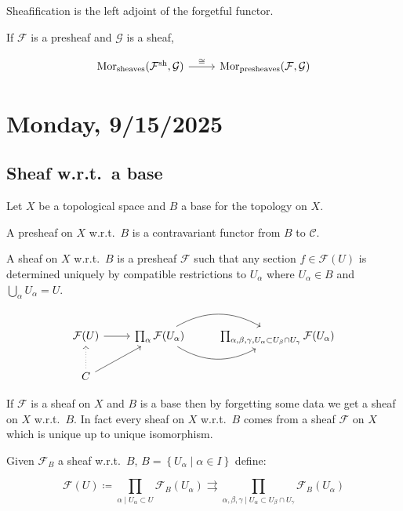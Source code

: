 \documentclass{article}
\theoremstyle{definition}
\begin{document}
    Sheafification is the left adjoint of the forgetful functor.

    If \(\mathcal{F}\) is a presheaf and \(\mathcal{G}\) is a sheaf,

    \[
        \begin{tikzcd}
            \operatorname{Mor}_{\text{sheaves}} (\mathcal{F}^{\operatorname{sh}}, \mathcal{G}) \ar[r, "\cong"] & \operatorname{Mor}_{\text{presheaves}} (\mathcal{F} , \mathcal{G}) 
        \end{tikzcd}
    \]

    \section*{Monday, 9/15/2025}

    \subsection*{Sheaf w.r.t.\ a base}
    
    Let \(X\) be a topological space and \(B\) a base for the topology on \(X\).

    A presheaf on \(X\) w.r.t.\ \(B\) is a contravariant functor from \(B\) to \(\mathcal{C}\).

    A sheaf on \(X\) w.r.t.\ \(B\) is a presheaf \(\mathcal{F}\) such that any section \(f\in \mathcal{F} (U)\) is determined uniquely by compatible restrictions to \(U_\alpha\) where \(U_\alpha \in B\) and \(\bigcup_{\alpha} U_\alpha = U\).

    \[
        \begin{tikzcd}
            \mathcal{F}(U) \ar[r] & \prod_{\alpha} \mathcal{F}(U_\alpha) \ar[r, bend right] \ar[r, bend left] & \prod_{\alpha,\beta,\gamma, U_\alpha \subset U_\beta \cap U_\gamma} \mathcal{F}(U_\alpha) \\ C \ar[u, dotted] \ar[ur]
        \end{tikzcd}
    \]

    If \(\mathcal{F}\) is a sheaf on \(X\) and \(B\) is a base then by forgetting some data we get a sheaf on \(X\) w.r.t.\ \(B\). In fact every sheaf on \(X\) w.r.t.\ \(B\) comes from a sheaf \(\mathcal{F}\) on \(X\) which is unique up to unique isomorphism.

    Given \(\mathcal{F}_B\) a sheaf w.r.t.\ \(B\), \(B = \left\{ U_\alpha \mid \alpha \in I \right\} \) define:
    
    \[
        \mathcal{F} (U) \coloneqq \prod_{\alpha \mid U_\alpha \subset U} \mathcal{F}_B (U_\alpha) \rightrightarrows \prod_{\alpha ,\beta, \gamma \mid U_\alpha \subset U_\beta \cap U_\gamma} \mathcal{F}_B (U_\alpha)
    \]
\end{document}
